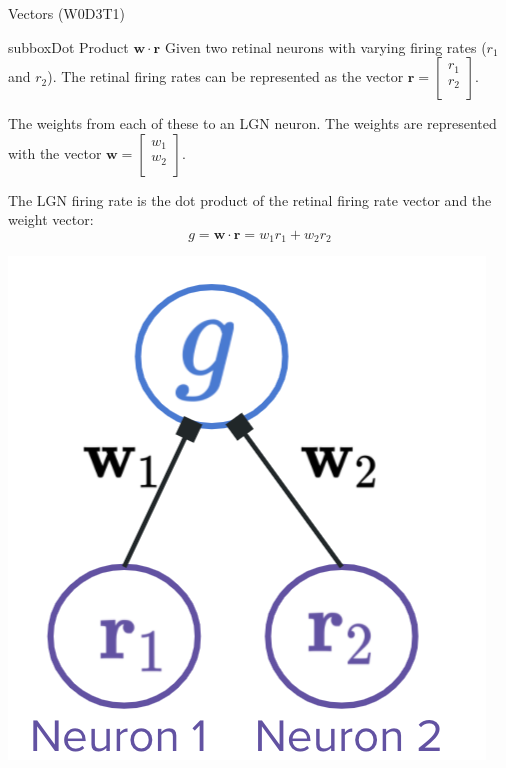 \begin{textbox}{Vectors (W0D3T1) }
\begin{subbox}{subbox}{Dot Product $\mathbf{w}\cdot\mathbf{r}$}
\scriptsize
Given two retinal neurons with varying firing rates ($r_1$ and $r_2$).  The retinal firing rates can be represented as the vector $\mathbf{r} = \begin{bmatrix} r_1\\ r_2\\ \end{bmatrix}$.

The weights from each of these to an LGN neuron. The weights are represented with the vector $\mathbf{w} = \begin{bmatrix} w_1\\ w_2\\ \end{bmatrix}$.

The LGN firing rate is the dot product of the retinal firing rate vector and the weight vector:
\begin{equation}
g = \mathbf{w}\cdot\mathbf{r} = w_1r_1 + w_2r_2
\end{equation}

\centering
\includegraphics[scale=0.3]{Figures/PreCourse/Figure2.png}
\end{subbox}

\end{textbox}

